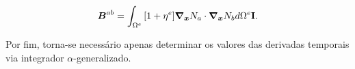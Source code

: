\begin{equation}
    \boldsymbol{B}^{ab}=\int_{\Omega^e}{[1+\eta^e]\boldsymbol{\nabla_x} N_a\cdot\boldsymbol{\nabla_x} N_b d\Omega^e}\mathbf{I}\text{.}
\end{equation}

Por fim, torna-se necessário apenas determinar os valores das derivadas temporais via integrador $\alpha$-generalizado.

